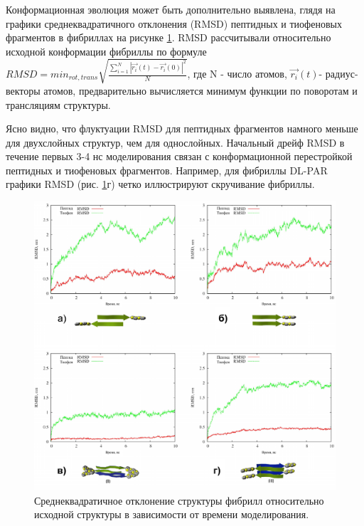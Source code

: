     Конформационная эволюция может быть дополнительно выявлена, глядя на графики среднеквадратичного отклонения (RMSD) пептидных и тиофеновых фрагментов в фибриллах на рисунке \ref{fig:p4_p5_f37}. RMSD рассчитывали относительно исходной конформации фибриллы по формуле $RMSD = min_{rot,trans} \sqrt{\frac{\sum_{i=1}^{N}|\vec{r_i}(t)-\vec{r_i}(0)|^2}{N}}$, где N - число атомов, $\vec{r_i}(t)$- радиус-векторы атомов, предварительно вычисляется минимум функции по поворотам и трансляциям структуры.
    
    Ясно видно, что флуктуации RMSD для пептидных фрагментов намного меньше для двухслойных структур, чем для однослойных. Начальный дрейф RMSD в течение первых 3-4 нс моделирования связан с конформационной перестройкой пептидных и тиофеновых фрагментов. Например, для фибриллы DL-PAR графики RMSD (рис. \ref{fig:p4_p5_f37}г) четко иллюстрируют скручивание фибриллы.

\begin{figure} [H]
    \centering
    \includegraphics[width=\textwidth]{images/p4/punkt5/part4_p5_f37.pdf}
    \caption[Среднеквадратичное отклонение структуры фибрилл относительно исходной структуры в зависимости от времени моделирования]{Среднеквадратичное отклонение структуры фибрилл относительно исходной структуры в зависимости от времени моделирования.}
    \label{fig:p4_p5_f37}
\end{figure}


